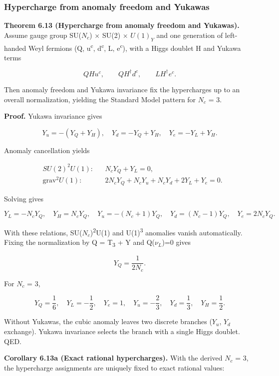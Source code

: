 \documentclass[11pt,a4paper]{article}
\theoremstyle{remark}
\begin{document}
\subsubsection{Hypercharge from anomaly freedom and Yukawas}\label{hypercharge-from-anomaly-freedom-and-yukawas}

\textbf{Theorem 6.13 (Hypercharge from anomaly freedom and Yukawas).} Assume gauge
group SU(\(N_c\)) \ensuremath{\times} SU(2) \ensuremath{\times} \(U(1)_Y\) and one generation of left-handed Weyl
fermions (Q, u\textsuperscript{c}, d\textsuperscript{c}, L, e\textsuperscript{c}), with a Higgs doublet H and Yukawa terms

\[
Q H u^c,\qquad Q H^\dagger d^c,\qquad L H^\dagger e^c.
\]

Then anomaly freedom and Yukawa invariance fix the hypercharges up to an
overall normalization, yielding the Standard Model pattern for \(N_c\) = 3.

\textbf{Proof.} Yukawa invariance gives

\[
Y_u = -(Y_Q + Y_H),\quad
Y_d = -Y_Q + Y_H,\quad
Y_e = -Y_L + Y_H.
\]

Anomaly cancellation yields

\[
\begin{aligned}
&SU(2)^2 U(1): && N_c Y_Q + Y_L = 0,\\
&\mathrm{grav}^2 U(1): && 2 N_c Y_Q + N_c Y_u + N_c Y_d + 2 Y_L + Y_e = 0.
\end{aligned}
\]

Solving gives

\[
Y_L = -N_c Y_Q,\quad
Y_H = N_c Y_Q,\quad
Y_u = -(N_c + 1) Y_Q,\quad
Y_d = (N_c - 1) Y_Q,\quad
Y_e = 2 N_c Y_Q.
\]

With these relations, SU(\(N_c\))\textsuperscript{2}U(1) and U(1)\textsuperscript{3} anomalies vanish
automatically. Fixing the normalization by Q = T\textsubscript{3} + Y and Q(\(\ensuremath{\nu}_L\))=0 gives

\[
Y_Q = \frac{1}{2 N_c}.
\]

For \(N_c\) = 3,

\[
Y_Q = \frac{1}{6},\quad Y_L = -\frac{1}{2},\quad Y_e = 1,\quad
Y_u = -\frac{2}{3},\quad Y_d = \frac{1}{3},\quad Y_H = \frac{1}{2}.
\]

Without Yukawas, the cubic anomaly leaves two discrete branches (\(Y_u\), \(Y_d\)
exchange). Yukawa invariance selects the branch with a single Higgs doublet.
QED.

\textbf{Corollary 6.13a (Exact rational hypercharges).} With the derived \(N_c\) = 3,
the hypercharge assignments are uniquely fixed to exact rational values:
\end{document}
